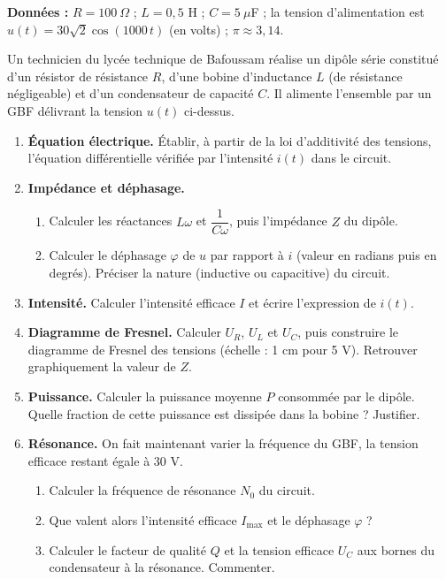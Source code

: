 \documentclass[11pt]{article}
\begin{document}
\begin{exercice}
\textbf{Données :} $R = 100\ \Omega$ ; $L = 0{,}5$ H ; $C = 5\ \mu$F ; la tension d'alimentation est $u(t) = 30\sqrt{2}\cos(1000\,t)$ (en volts) ; $\pi \approx 3{,}14$.

Un technicien du lycée technique de Bafoussam réalise un dipôle série constitué d'un résistor de résistance $R$, d'une bobine d'inductance $L$ (de résistance négligeable) et d'un condensateur de capacité $C$. Il alimente l'ensemble par un GBF délivrant la tension $u(t)$ ci-dessus.
\begin{enumerate}
\item \textbf{Équation électrique.} Établir, à partir de la loi d'additivité des tensions, l'équation différentielle vérifiée par l'intensité $i(t)$ dans le circuit.
\item \textbf{Impédance et déphasage.}
\begin{enumerate}
\item Calculer les réactances $L\omega$ et $\dfrac{1}{C\omega}$, puis l'impédance $Z$ du dipôle.
\item Calculer le déphasage $\varphi$ de $u$ par rapport à $i$ (valeur en radians puis en degrés). Préciser la nature (inductive ou capacitive) du circuit.
\end{enumerate}
\item \textbf{Intensité.} Calculer l'intensité efficace $I$ et écrire l'expression de $i(t)$.
\item \textbf{Diagramme de Fresnel.} Calculer $U_R$, $U_L$ et $U_C$, puis construire le diagramme de Fresnel des tensions (échelle : 1 cm pour 5 V). Retrouver graphiquement la valeur de $Z$.
\item \textbf{Puissance.} Calculer la puissance moyenne $P$ consommée par le dipôle. Quelle fraction de cette puissance est dissipée dans la bobine ? Justifier.
\item \textbf{Résonance.} On fait maintenant varier la fréquence du GBF, la tension efficace restant égale à $30$ V.
\begin{enumerate}
\item Calculer la fréquence de résonance $N_0$ du circuit.
\item Que valent alors l'intensité efficace $I_{\max}$ et le déphasage $\varphi$ ?
\item Calculer le facteur de qualité $Q$ et la tension efficace $U_C$ aux bornes du condensateur à la résonance. Commenter.
\end{enumerate}
\end{enumerate}
\end{exercice}
\end{document}
